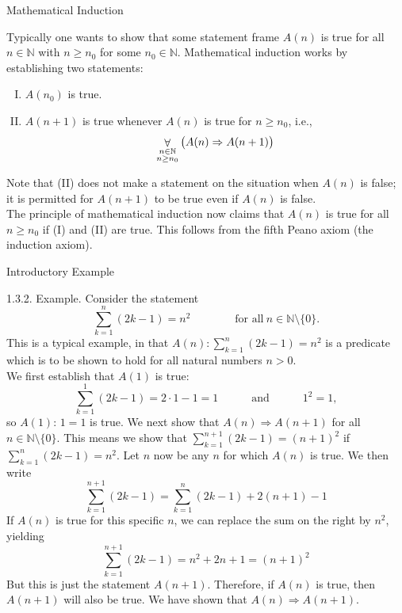 \documentclass[smaller,hyperref={CJKbookmarks=true}]{beamer}
\newcommand{\N}{\mathbb{N}} \newcommand{\Z}{\mathbb{Z}} \newcommand{\Q}{\mathbb{Q}}
\begin{document}
\begin{frame}[t]{Mathematical Induction}
\begin{spacing}{1.05}
Typically one wants to show that some statement frame $A(n)$ is true for all $n\in\N$ with $n\geq n_0$ for some $n_0\in\N$. Mathematical induction works by establishing two statements:\\[4pt]
\begin{enumerate}[(I)]
  \item $A(n_0)$ is true.
  \item $A(n+1)$ is true whenever $A(n)$ is true for $n\geq n_0$, i.e.,
      \[\mathop{\forall}_{\begin{subarray}{c}
                            n\in\N\\
                            n\geq n_0
                          \end{subarray}}\big(A(n)\Rightarrow A(n+1)\big)\]
\end{enumerate}
Note that (II) does not make a statement on the situation when $A(n)$ is false; it is permitted for $A(n+1)$ to be true even if $A(n)$ is false.\\[5pt]
The principle of mathematical induction now claims that $A(n)$ is true for all $n\geq n_0$ if (I) and (II) are true. This follows from the fifth Peano axiom (the induction axiom).
\end{spacing}
\end{frame}
\begin{frame}{Introductory Example}
\begin{spacing}{1.05}
\alert{1.3.2. Example.} Consider the statement
\[\sum_{k=1}^{n}(2k-1)=n^2\qquad\qquad
\text{for all}~n\in\N\setminus\{0\}.\]
This is a typical example, in that $A(n)\!:\sum_{k=1}^{n}(2k-1)=n^2$ is a predicate which is to be shown to hold for all natural numbers $n>0$.\\[5pt]
We first establish that $A(1)$ is true:
\[\sum_{k=1}^{1}(2k-1)=2\cdot1-1=1\qquad\quad
\text{and}\qquad\quad1^2=1,\]
so $A(1)\!:\,1=1$ is true.
\newpage
We next show that $A(n)\Rightarrow A(n+1)$ for all $n\in\N\setminus\{0\}$. This means we show that $\sum_{k=1}^{n+1}(2k-1)=(n+1)^2$ if $\sum_{k=1}^{n}(2k-1)=n^2$. Let $n$ now be any $n$ for which $A(n)$ is true. We then write
\[\sum_{k=1}^{n+1}(2k-1)=\sum_{k=1}^{n}(2k-1)
+2(n+1)-1\]
If $A(n)$ is true for this specific $n$, we can replace the sum on the right by $n^2$, yielding
\[\sum_{k=1}^{n+1}(2k-1)=n^2+2n+1=(n+1)^2\]
But this is just the statement $A(n+1)$. Therefore, if $A(n)$ is true, then $A(n+1)$ will also be true. We have shown that $A(n)\Rightarrow A(n+1)$.
\end{spacing}
\end{frame}
\end{document}
